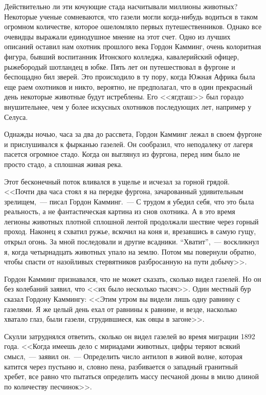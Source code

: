 \documentclass[12pt,a4paper,twoside,openany,svgnames]{memoir}
\begin{document}
Действительно ли эти кочующие стада насчитывали миллионы животных? Некоторые ученые сомневаются, что газели могли когда-нибудь водиться в таком огромном количестве, которое ошеломляло первых путешественников. Однако все очевидцы выражали единодушное мнение на этот счет. Одно из лучших описаний оставил нам охотник прошлого века Гордон Камминг, очень колоритная фигура, бывший воспитанник Итонского колледжа, кавалерийский офицер, рыжебородый шотландец в юбке. Пять лет он путешествовал в фургоне и беспощадно бил зверей. Это происходило в ту пору, когда Южная Африка была еще раем охотников и никто, вероятно, не предполагал, что в один прекрасный день некоторые животные будут истреблены. Его <<ягдташ>> был гораздо внушительнее, чем у более искусных охотников последующих лет, например у Селуса.

Однажды ночью, часа за два до рассвета, Гордон Камминг лежал в своем фургоне и прислушивался к фырканью газелей. Он сообразил, что неподалеку от лагеря пасется огромное стадо. Когда он выглянул из фургона, перед ним было не просто стадо, а сплошная живая река.

Этот бесконечный поток вливался в ущелье и исчезал за горной грядой. <<Почти два часа стоял я на передке фургона, зачарованный удивительным зрелищем,~--- писал Гордон Камминг.~--- С трудом я убедил себя, что это была реальность, а не фантастическая картина из снов охотника. А в это время легионы животных плотной сплошной лентой продолжали шествие через горный проход. Наконец я схватил ружье, вскочил на коня и, врезавшись в самую гущу, открыл огонь. За мной последовали и другие всадники. ``Хватит'',~--- воскликнул я, когда четырнадцать животных упало на землю. Потом мы повернули обратно, чтобы спасти от назойливых стервятников разбросанную на пути добычу>>.

Гордон Камминг признавался, что не может сказать, сколько видел газелей. Но он без колебаний заявил, что <<их было несколько тысяч>>. Один местный бур сказал Гордону Каммингу: <<Этим утром вы видели лишь одну равнину с газелями. Я же целый день ехал от равнины к равнине, и везде, насколько хватало глаз, были газели, сгрудившиеся, как овцы в загоне>>.

Скулли затруднялся ответить, сколько он видел газелей во время миграции 1892 года. <<Когда имеешь дело с мириадами животных, цифры теряют всякий смысл,~--- заявил он.~--- Определить число антилоп в живой волне, которая катится через пустыню и, словно пена, разбивается о западный гранитный хребет, все равно что пытаться определить массу песчаной дюны в милю длиной по количеству песчинок>>.
\end{document}
